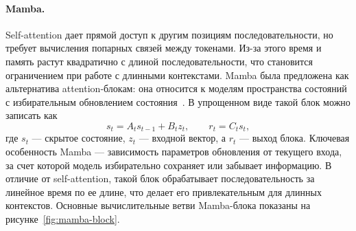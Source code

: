\paragraph{Mamba.}
Self-attention дает прямой доступ к другим позициям последовательности, но требует вычисления попарных связей между токенами. Из-за этого время и память растут квадратично с длиной последовательности, что становится ограничением при работе с длинными контекстами. Mamba была предложена как альтернатива attention-блокам: она относится к моделям пространства состояний с избирательным обновлением состояния~\cite{mamba}.
В упрощенном виде такой блок можно записать как
\[
	s_t = A_t s_{t-1} + B_t z_t, \qquad r_t = C_t s_t,
\]
где $s_t$ --- скрытое состояние, $z_t$ --- входной вектор, а $r_t$ --- выход блока.
Ключевая особенность Mamba --- зависимость параметров обновления от текущего входа, за счет которой модель избирательно сохраняет или забывает информацию.
В отличие от self-attention, такой блок обрабатывает последовательность за линейное время по ее длине, что делает его привлекательным для длинных контекстов.
Основные вычислительные ветви Mamba-блока показаны на рисунке~\ref{fig:mamba-block}.

